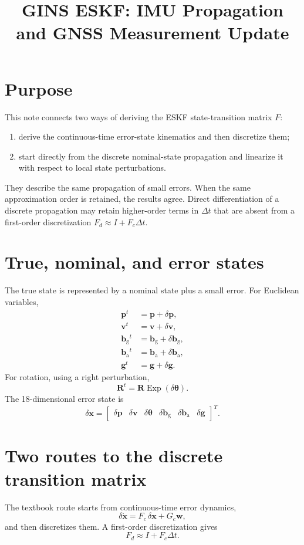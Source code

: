 \documentclass[11pt]{article}
\title{GINS ESKF: IMU Propagation and GNSS Measurement Update}
\author{}
\date{}
\newcommand{\R}{\mathbf{R}}
\newcommand{\p}{\mathbf{p}}
\newcommand{\vct}{\mathbf{v}}
\newcommand{\bg}{\mathbf{b}_{\mathrm{g}}}
\newcommand{\ba}{\mathbf{b}_{\mathrm{a}}}
\newcommand{\g}{\mathbf{g}}
\newcommand{\Exp}{\operatorname{Exp}}
\begin{document}
\maketitle

\section{Purpose}
This note connects two ways of deriving the ESKF state-transition matrix $F$:
\begin{enumerate}
    \item derive the continuous-time error-state kinematics and then discretize them;
    \item start directly from the discrete nominal-state propagation and linearize it with respect to local state perturbations.
\end{enumerate}
They describe the same propagation of small errors. When the same approximation order is retained, the results agree. Direct differentiation of a discrete propagation may retain higher-order terms in $\Delta t$ that are absent from a first-order discretization $F_d \approx I+F_c\Delta t$.

\section{True, nominal, and error states}
The true state is represented by a nominal state plus a small error. For Euclidean variables,
\begin{align}
\p^t &= \p + \delta\p,\\
\vct^t &= \vct + \delta\vct,\\
\bg{}^t &= \bg + \delta\bg,\\
\ba{}^t &= \ba + \delta\ba,\\
\g^t &= \g + \delta\g.
\end{align}
For rotation, using a right perturbation,
\begin{equation}
\R^t = \R\Exp(\delta\bm\theta).
\end{equation}
The 18-dimensional error state is
\begin{equation}
\delta\bm x =
\begin{bmatrix}
\delta\p &
\delta\vct &
\delta\bm\theta &
\delta\bg &
\delta\ba &
\delta\g
\end{bmatrix}^{T}.
\end{equation}

\section{Two routes to the discrete transition matrix}
The textbook route starts from continuous-time error dynamics,
\begin{equation}
\delta\dot{\bm x}=F_c\,\delta\bm x+G_c\bm w,
\end{equation}
and then discretizes them. A first-order discretization gives
\begin{equation}
F_d \approx I+F_c\Delta t.
\end{equation}
\end{document}
